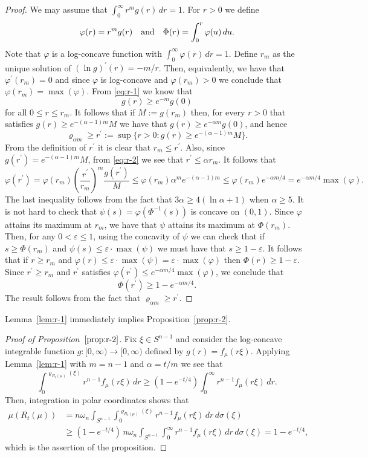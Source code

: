 \documentclass[11pt,leqno]{article}
\theoremstyle{definition}
\theoremstyle{remark}
\numberwithin{equation}{section}
\newcommand{\ls}{\leqslant}
\newcommand{\gr}{\geqslant}
\newcommand{\1}{\textbf{1}}
\begin{document}
\begin{proof}We may assume that $\int_0^{\infty}r^{m}g(r)\,dr=1$. For $r>0$ we define
$$\varphi(r)=r^{m}g(r)\quad\hbox{and}\quad \Phi(r)=\int_0^r\varphi(u)\,du.$$
Note that $\varphi$ is a log-concave function with $\int_0^{\infty}\varphi(r)\,dr=1$.
Define $r_m$ as the unique solution of $(\ln g)^{\prime}(r)=-m/r$. Then, equivalently, we have
that $\varphi^{\prime}(r_m)=0$ and since $\varphi$ is log-concave and $\varphi(r_m)>0$ we conclude
that $\varphi(r_m)=\max(\varphi)$. From \eqref{eq:r-1} we know that
$$g(r)\gr e^{-m}g(0)$$
for all $0\ls r\ls r_m$. It follows that if $M:=g(r_m)$ then, for every $r>0$ that satisfies
$g(r)\gr e^{-(\alpha-1)m}M$ we have that $g(r)\gr e^{-\alpha m}g(0)$, and hence
$$\varrho_{\alpha m}\gr r^{\prime}:=\sup\{r>0:g(r)\gr e^{-(\alpha -1)m}M\}.$$
From the definition of $r^{\prime}$ it is clear that $r_m\ls r^{\prime}$.
Also, since $g(r^{\prime})=e^{-(\alpha-1)m}M$, from \eqref{eq:r-2} we see that $r^{\prime}\ls\alpha r_m$. It follows that
\begin{equation*}
\varphi(r^{\prime}) =\varphi(r_m)\left(\frac{r^{\prime}}{r_m}\right)^{m}\frac{g(r^{\prime})}{M}\ls
\varphi(r_m)\alpha^{m}e^{-(\alpha-1)m}\ls \varphi(r_m)e^{-\alpha m/4}=e^{-\alpha m/4}\max(\varphi).
\end{equation*}
The last inequality follows from the fact that $3\alpha \gr 4(\ln \alpha +1)$ when $\alpha\gr 5$.
It is not hard to check that $\psi(s)=\varphi(\Phi^{-1}(s))$ is concave on $(0,1)$.  Since $\varphi$
attains its maximum at $r_m$, we have that $\psi$ attains its maximum at $\Phi(r_m)$. Then, for any
$0<\varepsilon\ls 1$, using the concavity of $\psi$ we can check that if
$s\gr \Phi(r_m)$ and $\psi(s)\ls\varepsilon\cdot\max(\psi)$
we must have that $s\gr 1-\varepsilon$. It follows that if $r\gr r_m$ and
$\varphi(r)\ls\varepsilon\cdot\max(\psi)=\varepsilon\cdot\max(\varphi)$ then
$\Phi(r)\gr 1-\varepsilon$. Since $r^{\prime}\gr r_m$ and $r^{\prime}$
satisfies $\varphi(r^{\prime})\ls e^{-\alpha m/4}\max(\varphi)$, we conclude that
$$\Phi(r^{\prime})\gr 1-e^{-\alpha m/4}.$$
The result follows from the fact that $\varrho_{\alpha m}\gr r^{\prime}$.
\end{proof}

Lemma~\ref{lem:r-1} immediately implies Proposition~\ref{prop:r-2}.

\begin{proof}[Proof of Proposition~$\ref{prop:r-2}$]Fix $\xi\in S^{n-1}$ and consider the log-concave integrable function $g:[0,\infty)\to[0,\infty)$
defined by $g(r)=f_{\mu}(r\xi)$. Applying Lemma~\ref{lem:r-1} with $m=n-1$ and $\alpha=t/m$ we see that
$$\int_0^{\varrho_{R_t(\mu)}(\xi)}r^{n-1}f_{\mu}(r\xi)\,dr
\gr \left(1-e^{-t/4}\right)\int_0^{\infty}r^{n-1}f_{\mu}(r\xi)\,dr.$$
Then, integration in polar coordinates shows that
\begin{align*}\mu(R_t(\mu )) &=n\omega_n\int_{S^{n-1}}\int_0^{\varrho_{R_t(\mu)}(\xi)}r^{n-1}f_{\mu}(r\xi)\,dr\,d\sigma(\xi)\\
&\gr \left(1-e^{-t/4}\right)\,n\omega_n\int_{S^{n-1}}\int_0^{\infty}r^{n-1}f_{\mu}(r\xi)\,dr\,d\sigma(\xi)=1-e^{-t/4},
\end{align*}
which is the assertion of the proposition.
\end{proof}
\end{document}
